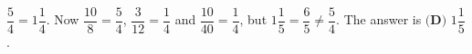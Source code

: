 $\dfrac54=1\dfrac14$. Now $\dfrac{10}{8}=\dfrac54$, $\dfrac{3}{12}=\dfrac14$ and $\dfrac{10}{40}=\dfrac14$, but $1\dfrac15=\dfrac65\ne\dfrac54$. The answer is $\boxed{\textbf{(D) }1\dfrac15}$.
